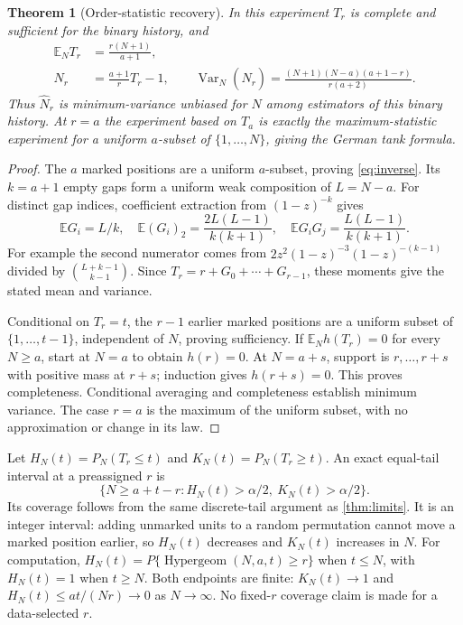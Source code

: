 \documentclass[11pt]{article}
\newtheorem{theorem}{Theorem}[section]
\theoremstyle{remark}\newtheorem{remark}[theorem]{Remark}
\newcommand{\E}{\mathbb E}\newcommand{\PP}{\mathbb P}
\newcommand{\Var}{\operatorname{Var}}\newcommand{\Cov}{\operatorname{Cov}}
\newcommand{\fall}[2]{(#1)_{#2}}\newcommand{\rise}[2]{(#1)^{\overline{#2}}}
\begin{document}
\begin{theorem}[Order-statistic recovery]\label{thm:inverse}
In this experiment $T_r$ is complete and sufficient for the binary history,
and
\begin{align}
 \E_N T_r&=\frac{r(N+1)}{a+1},\\
 \widehat N_r&=\frac{a+1}{r}T_r-1,\qquad
 \Var_N(\widehat N_r)=\frac{(N+1)(N-a)(a+1-r)}{r(a+2)}.\label{eq:invvariance}
\end{align}
Thus $\widehat N_r$ is minimum-variance unbiased for $N$ among estimators
of this binary history. At $r=a$ the experiment based on $T_a$ is exactly
the maximum-statistic experiment for a uniform $a$-subset of
$\{1,\ldots,N\}$, giving the German tank formula.
\end{theorem}
\begin{proof}
The $a$ marked positions are a uniform $a$-subset, proving \eqref{eq:inverse}.
Its $k=a+1$ empty gaps form a uniform weak composition of $L=N-a$.
For distinct gap indices, coefficient extraction from $(1-z)^{-k}$ gives
\[
 \E G_i=L/k,\quad
 \E\fall{G_i}{2}=\frac{2L(L-1)}{k(k+1)},\quad
 \E G_iG_j=\frac{L(L-1)}{k(k+1)}.
\]
For example the second numerator comes from
$2z^2(1-z)^{-3}(1-z)^{-(k-1)}$ divided by
$\binom{L+k-1}{k-1}$. Since
$T_r=r+G_0+\cdots+G_{r-1}$, these moments give the stated mean and variance.

Conditional on $T_r=t$, the $r-1$ earlier marked positions are a uniform
subset of $\{1,\ldots,t-1\}$, independent of $N$, proving sufficiency.
If $\E_N h(T_r)=0$ for every $N\ge a$, start at $N=a$ to obtain $h(r)=0$.
At $N=a+s$, support is $r,\ldots,r+s$ with positive mass at $r+s$;
induction gives $h(r+s)=0$. This proves completeness. Conditional averaging
and completeness establish minimum variance. The case $r=a$ is the maximum
of the uniform subset, with no approximation or change in its law.
\end{proof}
Let $H_N(t)=P_N(T_r\le t)$ and $K_N(t)=P_N(T_r\ge t)$.
An exact equal-tail interval at a preassigned $r$ is
\begin{equation}\label{eq:inverseCI}
 \{N\ge a+t-r:H_N(t)>\alpha/2,\ K_N(t)>\alpha/2\}.
\end{equation}
Its coverage follows from the same discrete-tail argument as
\cref{thm:limits}. It is an integer interval: adding unmarked units to a
random permutation cannot move a marked position earlier, so $H_N(t)$
decreases and $K_N(t)$ increases in $N$.
For computation, $H_N(t)=P\{\operatorname{Hypergeom}(N,a,t)\ge r\}$ when
$t\le N$, with $H_N(t)=1$ when $t\ge N$.
Both endpoints are finite: $K_N(t)\to1$ and
$H_N(t)\le at/(Nr)\to0$ as $N\to\infty$.
No fixed-$r$ coverage claim is made for a data-selected $r$.
\end{document}
